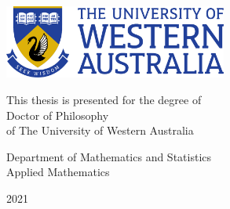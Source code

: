 \begin{titlepage}

\centering

\vspace*{6em}

{\Huge\bfseries
   \\
   \\
}

\vfill

{\Huge
   \\
}
{\huge
   \\
}

\vfill

\includegraphics[width=0.55\textwidth]{frontmatter/uwa-logo}

\vspace{2.5em}

{\LARGE
  This thesis is presented for the degree of \\
  Doctor of Philosophy \\
  of The University of Western Australia \\
}

\vspace{2em}

{\Large
  Department of Mathematics and Statistics \\
  Applied Mathematics \\
}

\vspace{1.5em}

{\huge
  2021 \\
}

\vspace{3em}

\end{titlepage}
